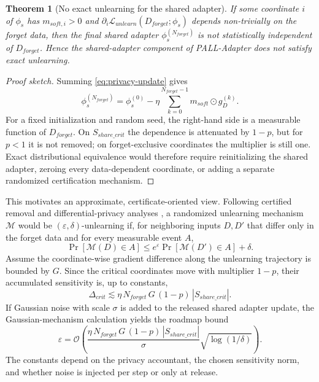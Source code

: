 \documentclass[conference]{IEEEtran}
\theoremstyle{plain}
\newtheorem{theorem}{Theorem}
\theoremstyle{definition}
\theoremstyle{remark}
\begin{document}
\begin{theorem}[No exact unlearning for the shared adapter]
\label{thm:shared-adapter-impossibility}
If some coordinate $i$ of $\phi_s$ has $m_{soft,i}>0$ and
$\partial_i\mathcal{L}_{unlearn}(D_{forget};\phi_s)$ depends
non-trivially on the forget data, then the final shared adapter
$\phi_s^{(N_{forget})}$ is not statistically independent of
$D_{forget}$. Hence the shared-adapter component of PALL-Adapter does
not satisfy exact unlearning.
\end{theorem}

\begin{proof}[Proof sketch]
Summing \eqref{eq:privacy-update} gives
\begin{equation}
\phi_s^{(N_{forget})}
=
\phi_s^{(0)}
-\eta\sum_{k=0}^{N_{forget}-1}
m_{soft}\odot g_D^{(k)}.
\end{equation}
For a fixed initialization and random seed, the right-hand side is a
measurable function of $D_{forget}$. On $S_{share\_crit}$ the
dependence is attenuated by $1-p$, but for $p<1$ it is not removed; on
forget-exclusive coordinates the multiplier is still one. Exact
distributional equivalence would therefore require reinitializing the
shared adapter, zeroing every data-dependent coordinate, or adding a
separate randomized certification mechanism.
\end{proof}

This motivates an approximate, certificate-oriented view. Following
certified removal and differential-privacy analyses
\cite{guo2020certified,dwork2014algorithmic}, a randomized unlearning
mechanism $\mathcal{M}$ would be $(\varepsilon,\delta)$-unlearning if,
for neighboring inputs $D,D'$ that differ only in the forget data and
for every measurable event $A$,
\begin{equation}
\label{eq:ed-def}
\Pr[\mathcal{M}(D)\in A]
\le
e^\varepsilon \Pr[\mathcal{M}(D')\in A]+\delta.
\end{equation}
Assume the coordinate-wise gradient difference along the unlearning
trajectory is bounded by $G$. Since the critical coordinates move with
multiplier $1-p$, their accumulated sensitivity is, up to constants,
\begin{equation}
\label{eq:crit-sensitivity}
\Delta_{crit}
\lesssim
\eta\,N_{forget}\,G\,(1-p)\,|S_{share\_crit}|.
\end{equation}
If Gaussian noise with scale $\sigma$ is added to the released shared
adapter update, the Gaussian-mechanism calculation yields the roadmap
bound
\begin{equation}
\label{eq:epsilon-roadmap}
\varepsilon
=
\mathcal{O}\!\left(
\frac{\eta\,N_{forget}\,G\,(1-p)\,|S_{share\_crit}|}{\sigma}
\sqrt{\log(1/\delta)}
\right).
\end{equation}
The constants depend on the privacy accountant, the chosen sensitivity
norm, and whether noise is injected per step or only at release.
\end{document}
